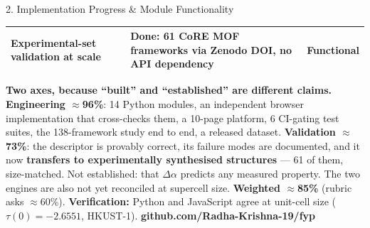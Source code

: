 \documentclass[aspectratio=169, 11pt]{beamer}
\begin{document}
\begin{frame}{2. Implementation Progress \& Module Functionality}
\begin{table}
\begin{tabular}{p{3.0cm} p{7.0cm} c}
Experimental-set validation at scale & \textbf{Done:} 61 CoRE MOF frameworks via Zenodo DOI,
no API dependency & \textcolor{okGreen}{\textbf{Functional}} \\
\bottomrule
\end{tabular}
\end{table}
\vspace{-0.32cm}
{\tiny
\textbf{Two axes, because ``built'' and ``established'' are different claims.}
\textbf{Engineering $\approx$96\%}: 14 Python modules, an independent browser
implementation that cross-checks them, a 10-page platform, 6 CI-gating test suites, the
138-framework study end to end, a released dataset.
\textbf{Validation $\approx$73\%}: the descriptor is provably correct, its failure modes are
documented, and it now \textbf{transfers to experimentally synthesised structures} --- 61 of
them, size-matched. Not established: that $\Delta\alpha$ predicts any measured property.
The two engines are also not yet reconciled at supercell size.
\textbf{Weighted $\approx$85\%} (rubric asks $\approx$60\%).
\textbf{Verification:} Python and JavaScript agree at unit-cell size ($\tau(0)=-2.6551$,
HKUST-1). \textbf{github.com/Radha-Krishna-19/fyp}}
\end{frame}
\end{document}
